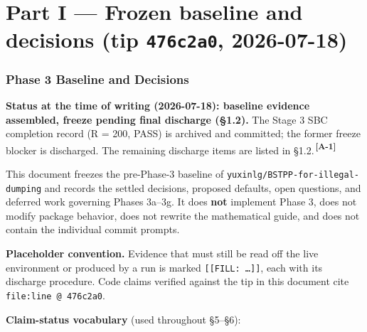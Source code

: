 \documentclass[
  10pt,
]{article}
\newcommand{\amdref}[1]{{\color{amdcolor}\textsuperscript{\,\textbf{[#1]}}}}
\begin{document}
\hypertarget{part-i}{%
\part*{Part I --- Frozen baseline and decisions (tip \texttt{476c2a0}, 2026-07-18)}\label{part-i}}

\hypertarget{phase-3-baseline-and-decisions}{%
\section{Phase 3 Baseline and Decisions}\label{phase-3-baseline-and-decisions}}

\textbf{Status at the time of writing (2026-07-18): baseline evidence assembled, freeze pending final discharge (§1.2).} The Stage 3 SBC completion record (R = 200, PASS) is archived and committed; the former freeze blocker is discharged. The remaining discharge items are listed in §1.2.\amdref{A-1}

This document freezes the pre-Phase-3 baseline of \texttt{yuxinlg/\allowbreak{}BSTPP-for-illegal-dumping} and records the settled decisions, proposed defaults, open questions, and deferred work governing Phases 3a--3g. It does \textbf{not} implement Phase 3, does not modify package behavior, does not rewrite the mathematical guide, and does not contain the individual commit prompts.

\textbf{Placeholder convention.} Evidence that must still be read off the live environment or produced by a run is marked \texttt{{[}{[}FILL:\ …{]}{]}}, each with its discharge procedure. Code claims verified against the tip in this document cite \texttt{file:line\ @\ 476c2a0}.

\textbf{Claim-status vocabulary} (used throughout §5--§6):
\end{document}
